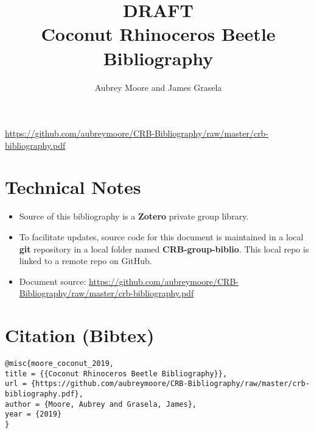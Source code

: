 \documentclass[12pt,letterpaper,english]{scrartcl}
\title{DRAFT \\ Coconut Rhinoceros Beetle Bibliography}
\author{Aubrey Moore and James Grasela}
\begin{document}
\maketitle

\begin{center}
\small{\url{https://github.com/aubreymoore/CRB-Bibliography/raw/master/crb-bibliography.pdf}}
\end{center}

\printbibliography

\nocite{*}

\section*{Technical Notes}

\begin{itemize}
	\item Source of this bibliography is a \textbf{Zotero} private group library. 
	\item To facilitate updates, source code for this document is maintained in a local \textbf{git} repository in a local folder named \textbf{CRB-group-biblio}. This local repo is linked to a remote repo on GitHub. 
	\item Document source: \url{https://github.com/aubreymoore/CRB-Bibliography/raw/master/crb-bibliography.pdf}
\end{itemize}

\section*{Citation (Bibtex)}

\begin{verbatim}
@misc{moore_coconut_2019,
title = {{Coconut Rhinoceros Beetle Bibliography}},
url = {https://github.com/aubreymoore/CRB-Bibliography/raw/master/crb-bibliography.pdf},
author = {Moore, Aubrey and Grasela, James},
year = {2019}
}
\end{verbatim}
\end{document}
